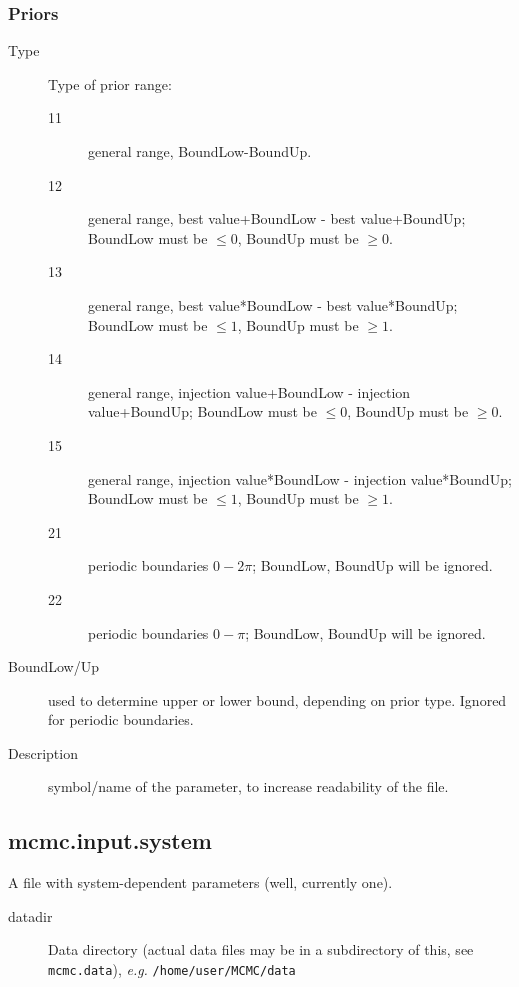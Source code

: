\documentclass[10pt]{article}
\begin{document}
\subsubsection{Priors}
\begin{description}                
\item[Type] Type of prior range:
  \begin{description}                
  \item[11] general range, BoundLow-BoundUp.
  \item[12] general range, best value+BoundLow - best value+BoundUp; BoundLow must be $\leq 0$, BoundUp must be $\geq 0$.
  \item[13] general range, best value*BoundLow - best value*BoundUp; BoundLow must be $\leq 1$, BoundUp must be $\geq 1$. 
  \item[14] general range, injection value+BoundLow - injection value+BoundUp; BoundLow must be $\leq 0$, BoundUp must be $\geq 0$.
  \item[15] general range, injection value*BoundLow - injection value*BoundUp; BoundLow must be $\leq 1$, BoundUp must be $\geq 1$. 
  \item[21] periodic boundaries $0-2\pi$; BoundLow, BoundUp will be ignored.
  \item[22] periodic boundaries $0-\pi$; BoundLow, BoundUp will be ignored.
  \end{description}                
\item[BoundLow/Up] used to determine upper or lower bound, depending on prior type.  Ignored for periodic boundaries.
\item[Description] symbol/name of the parameter, to increase readability of the file.
\end{description}                



\pagebreak
\subsection{mcmc.input.system}
A file with system-dependent parameters (well, currently one).

\begin{description}
\item[datadir] Data directory (actual data files may be in a subdirectory of this, see \texttt{mcmc.data}), \textit{e.g.} \texttt{/home/user/MCMC/data}
\end{description}
\end{document}

